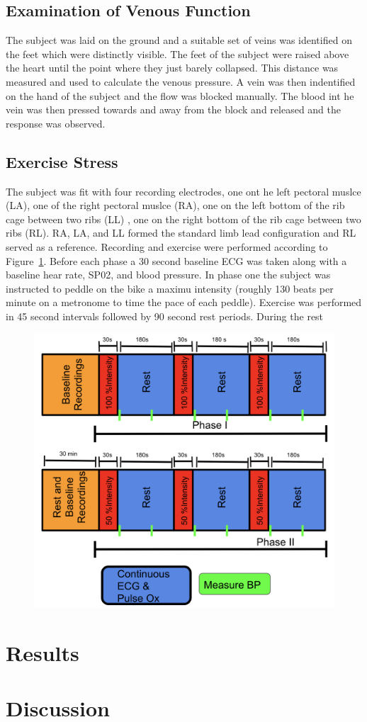 \documentclass[12pt]{article}
\begin{document}
\subsection{Examination of Venous Function}
The subject was laid on the ground and a suitable set of veins was identified on the feet which were distinctly visible. The feet of the subject were raised above the heart until the point where they just barely collapsed. This distance was measured and used to calculate the venous pressure. A vein was then indentified on the hand of the subject and the flow was blocked manually.  The blood int he vein was then pressed towards and away from the block and released and the response was observed.

\subsection{Exercise Stress}
The subject was fit with four recording electrodes, one ont he left pectoral muslce (LA), one of the right pectoral muslce (RA), one on the left bottom of the rib cage between two ribs (LL) , one on the right bottom of the rib cage between two ribs (RL). RA, LA, and LL formed the standard limb lead configuration and RL served as a reference. Recording and exercise were performed according to Figure~\ref{fig:Protocol}. Before each phase a 30 second baseline ECG was taken along with a baseline hear rate, SP02, and blood pressure. In phase one the subject was instructed to peddle on the bike a maximu intensity (roughly 130 beats per minute on a metronome to time the pace of each peddle). Exercise was performed in 45 second intervals followed by 90 second rest periods. During the rest

\begin{figure}[H]
	
	\centering
	\includegraphics[width = .8\textwidth]{Figures/protocol.png}
	\caption{}
	\label{fig:Protocol}
\end{figure}

\section{Results}

\section{Discussion}


%
%
\end{document}
